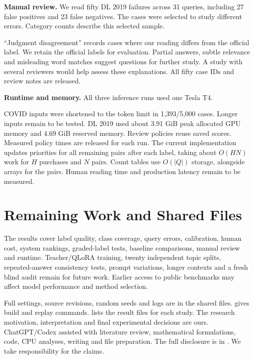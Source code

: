 \documentclass[11pt,a4paper]{article}
\begin{document}
\textbf{Manual review.} We read fifty DL 2019 failures across 31 queries,
including 27 false positives and 23 false negatives. The cases were selected
to study different errors. Category counts describe this selected sample.
\begin{center}\small\end{center}
``Judgment disagreement'' records cases where our reading differs from the
official label. We retain the official labels for evaluation. Partial answers,
subtle relevance and misleading word matches suggest questions for further
study. A study with several reviewers would help assess these explanations.
All fifty case IDs and review notes are released.

\textbf{Runtime and memory.} All three inference runs used one Tesla T4.
\begin{center}\small\end{center}
COVID inputs were shortened to the token limit in 1,393/5,000 cases.
Longer inputs remain to be tested. DL 2019 used about 3.91 GiB peak allocated
GPU memory and 4.69 GiB reserved memory. Review policies reuse saved scores.
Measured policy times are released for each run. The current implementation
updates priorities for all remaining pairs after each label, taking about
$O(HN)$ work for $H$ purchases and $N$ pairs. Count tables use $O(|Q|)$ storage,
alongside arrays for the pairs. Human reading time and production latency
remain to be measured.

\section{Remaining Work and Shared Files}
The results cover label quality, class coverage, query errors, calibration,
human cost, system rankings, graded-label tests, baseline comparisons, manual
review and runtime. Teacher/QLoRA training, twenty independent topic splits,
repeated-answer consistency tests, prompt variations, longer contexts and a
fresh blind audit remain for future work. Earlier access to public benchmarks
may affect model performance and method selection.

Full settings, source revisions, random seeds and logs are in the shared files.
 gives build and replay commands.
 lists the result files for each study.
The research motivation, interpretation and final experimental decisions are ours.
ChatGPT/Codex assisted with literature review, mathematical formulations, code,
CPU analyses, writing and file preparation. The full disclosure is in
. We take responsibility for the claims.
\end{document}
